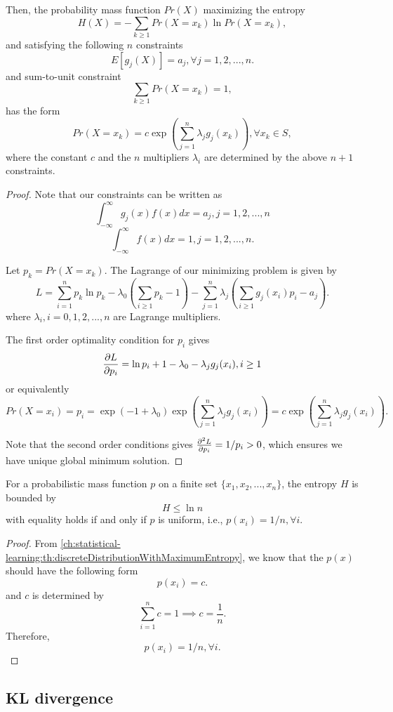 \begin{refsection}
\begin{theorem}
	Then, the probability mass function $Pr(X)$ maximizing the entropy
	$$H(X) = -\sum_{k\geq 1} Pr(X=x_k)\ln Pr(X=x_k),$$
	and satisfying the following $n$ constraints
	$$E[g_j(X)] = a_j, \forall j=1,2,...,n.$$
	and sum-to-unit constraint
	$$\sum_{k\geq 1} Pr(X=x_k) = 1,$$
	has the form
	$$Pr(X=x_k) = c\exp(\sum_{j=1}^{n} \lambda_j g_j(x_k)), \forall x_k \in S,$$
	where the constant $c$ and the $n$ multipliers $\lambda_i$ are determined by the above $n+1$ constraints.
\end{theorem}
\begin{proof}
	Note that our constraints can be written as
	$$\int_{-\infty}^{\infty} g_j(x)f(x) dx = a_j,j = 1,2,...,n $$	
	$$\int_{-\infty}^{\infty} f(x) dx = 1,j = 1,2,...,n.$$	
	
	Let $p_k = Pr(X = x_k)$. The Lagrange of our minimizing problem is given by
	$$L = \sum_{i=1}^{n} p_k\ln p_k - \lambda_0(\sum_{i\geq 1} p_k - 1) - \sum_{j=1}^{n} \lambda_j(\sum_{i\geq 1} g_j(x_i)p_i - a_j).$$
	where $\lambda_i,i=0,1,2,...,n$ are Lagrange multipliers.
	
	The first order optimality condition for $p_i$ gives
	$$\frac{\partial L}{\partial p_i} = \ln p_i + 1 - \lambda_0 - \lambda_j g_j(x_i),i\geq 1$$
	or equivalently 
	$$Pr(X=x_i) = p_i = \exp(-1+\lambda_0) \exp(\sum_{j=1}^{n} \lambda_j g_j(x_i)) = c\exp(\sum_{j=1}^{n} \lambda_j g_j(x_i)).$$
	
	Note that the second order conditions gives $\frac{\partial^2 L}{\partial p_i} = 1/p_i > 0$, which ensures we have unique global minimum solution.	
\end{proof}


\begin{corollary}\hfill
	For a probabilistic mass function $p$ on a finite set $\{x_1,x_2,...,x_n\}$, the entropy $H$ is bounded by
	$$H \leq \ln n$$
	with equality holds if and only if $p$ is uniform, i.e., $p(x_i) = 1/n, \forall i$.
\end{corollary}
\begin{proof}
	From \autoref{ch:statistical-learning:th:discreteDistributionWithMaximumEntropy}, we know that the $p(x)$ should have the following form
	$$p(x_i) = c.$$
	and $c$ is determined by
	$$\sum_{i=1}^n c = 1 \implies c = \frac{1}{n}.$$
	Therefore, 
	$$p(x_i)=1/n, \forall i.$$
\end{proof}

\subsection{KL divergence}


\end{refsection}
